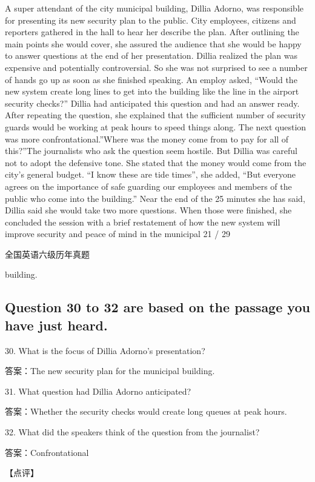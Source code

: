 \documentclass[UTF8,11pt]{ctexart}
\begin{document}
A super attendant of the city municipal building, Dillia Adorno, was responsible for presenting its new security plan to the public. City employees, citizens and reporters gathered in the hall to hear her describe the plan. After outlining the main points she would cover, she assured the audience that she would be happy to answer questions at the end of her presentation. Dillia realized the plan was expensive and potentially controversial. So she was not surprised to see a number of hands go up as soon as she finished speaking. An employ asked, “Would the new system create long lines to get into the building like the line in the airport security checks?” Dillia had anticipated this question and had an answer ready. After repeating the question, she explained that the sufficient number of security guards would be working at peak hours to speed things along. The next question was more confrontational.”Where was the money come from to pay for all of this?”The journalists who ask the question seem hostile. But Dillia was careful not to adopt the defensive tone. She stated that the money would come from the city’s general budget. “I know these are tide times”, she added, “But everyone agrees on the importance of safe guarding our employees and members of the public who come into the building.” Near the end of the 25 minutes she has said, Dillia said she would take two more questions. When those were finished, she concluded the session with a brief restatement of how the new system will improve security and peace of mind in the municipal 21 / 29


全国英语六级历年真题


building.


\subsection*{Question 30 to 32 are based on the passage you have just heard.}


30. What is the focus of Dillia Adorno’s presentation?


答案：The new security plan for the municipal building.


31. What question had Dillia Adorno anticipated?


答案：Whether the security checks would create long queues at peak hours.


32. What did the speakers think of the question from the journalist?


答案：Confrontational


【点评】
\end{document}
